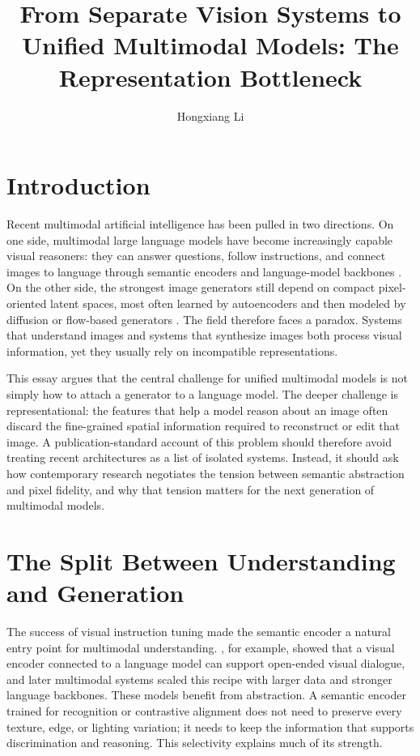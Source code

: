 \documentclass[12pt]{article}
\title{From Separate Vision Systems to Unified Multimodal Models: The Representation Bottleneck}
\author{Hongxiang Li}
\date{}
\begin{document}
\maketitle

\section{Introduction}

Recent multimodal artificial intelligence has been pulled in two directions. On one side, multimodal large language models have become increasingly capable visual reasoners: they can answer questions, follow instructions, and connect images to language through semantic encoders and language-model backbones \citep{liu2023visual,team2024chameleon}. On the other side, the strongest image generators still depend on compact pixel-oriented latent spaces, most often learned by autoencoders and then modeled by diffusion or flow-based generators \citep{kingma2013vae,rombach2022high,esser2024scaling}. The field therefore faces a paradox. Systems that understand images and systems that synthesize images both process visual information, yet they usually rely on incompatible representations.

This essay argues that the central challenge for unified multimodal models is not simply how to attach a generator to a language model. The deeper challenge is representational: the features that help a model reason about an image often discard the fine-grained spatial information required to reconstruct or edit that image. A publication-standard account of this problem should therefore avoid treating recent architectures as a list of isolated systems. Instead, it should ask how contemporary research negotiates the tension between semantic abstraction and pixel fidelity, and why that tension matters for the next generation of multimodal models.

\section{The Split Between Understanding and Generation}

The success of visual instruction tuning made the semantic encoder a natural entry point for multimodal understanding. \citet{liu2023visual}, for example, showed that a visual encoder connected to a language model can support open-ended visual dialogue, and later multimodal systems scaled this recipe with larger data and stronger language backbones. These models benefit from abstraction. A semantic encoder trained for recognition or contrastive alignment does not need to preserve every texture, edge, or lighting variation; it needs to keep the information that supports discrimination and reasoning. This selectivity explains much of its strength.
\end{document}

